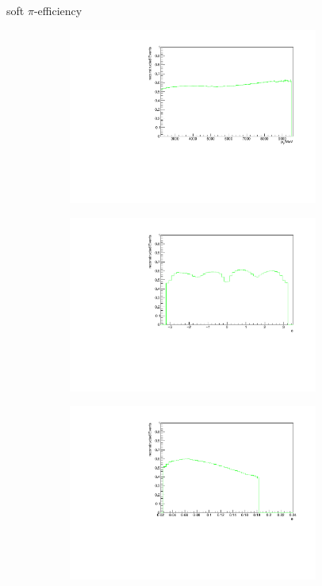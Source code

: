 \documentclass[11pt]{beamer}
\begin{document}
\begin{frame}{soft $\pi$-efficiency}
\begin{figure}
\begin{subfigure}{0.45\textwidth}
\includegraphics[width=0.9\textwidth]{up_pdf/single/tot/h_pt_reco_Dst.pdf}
\end{subfigure}
\begin{subfigure}{0.45\textwidth}
\includegraphics[width=0.9\textwidth]{up_pdf/single/tot/h_phi_reco_Dst.pdf}
\end{subfigure}
\begin{subfigure}{0.45\textwidth}
\includegraphics[width=0.9\textwidth]{up_pdf/single/tot/h_theta_reco_Dst.pdf}

\end{subfigure}
\end{figure}
\end{frame}
\end{document}
